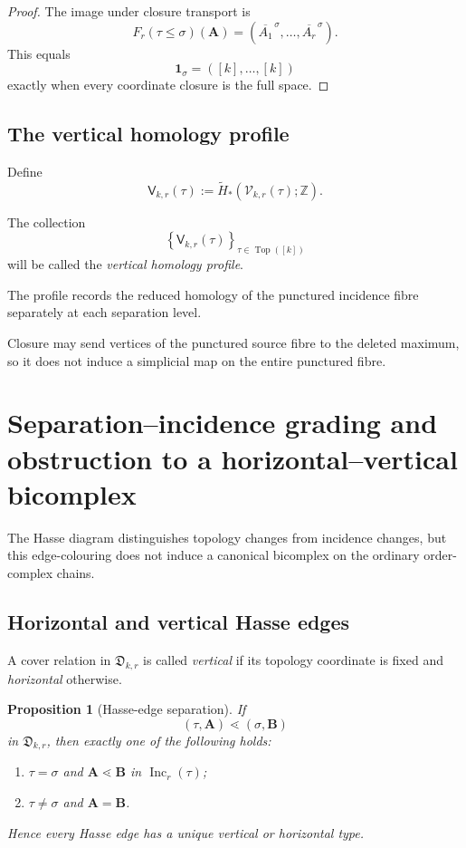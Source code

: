 \documentclass[11pt]{article}
\theoremstyle{plain}
\newtheorem{proposition}[theorem]{Proposition}
\theoremstyle{definition}
\begin{document}
\begin{proof}
The image under closure transport is
\[
F_r(\tau\leq\sigma)(\mathbf A)
=
\left(
\overline{A_1}^{\,\sigma},
\ldots,
\overline{A_r}^{\,\sigma}
\right).
\]
This equals
\[
\mathbf1_\sigma
=
([k],\ldots,[k])
\]
exactly when every coordinate closure is the full space.
\end{proof}



\subsection{The vertical homology profile}
\label{subsec:vertical-homology-profile}

Define
\[
\mathsf V_{k,r}(\tau)
:=
\widetilde H_*
\left(
\mathcal V_{k,r}(\tau);
\mathbb Z
\right).
\]

The collection
\[
\left\{
\mathsf V_{k,r}(\tau)
\right\}_{\tau\in\operatorname{Top}([k])}
\]
will be called the \emph{vertical homology profile}.

The profile records the reduced homology of the punctured incidence fibre
separately at each separation level.

Closure may send vertices of the punctured source fibre to the deleted maximum, so it does not induce a simplicial map on the entire punctured fibre.




\section{Separation--incidence grading and obstruction to a horizontal--vertical bicomplex}
\label{sec:separation-incidence-grading}

The Hasse diagram distinguishes topology changes from incidence changes, but this edge-colouring does not induce a canonical bicomplex on the ordinary order-complex chains.

\subsection{Horizontal and vertical Hasse edges}
\label{subsec:horizontal-vertical-Hasse}

A cover relation in $\mathfrak D_{k,r}$ is called \emph{vertical} if its topology
coordinate is fixed and \emph{horizontal} otherwise.

\begin{proposition}[Hasse-edge separation]
\label{prop:Hasse-bicoloring}
If
\[
(\tau,\mathbf A)\lessdot(\sigma,\mathbf B)
\]
in $\mathfrak D_{k,r}$, then exactly one of the following holds:
\begin{enumerate}[label=(\roman*)]
\item $\tau=\sigma$ and $\mathbf A\lessdot\mathbf B$ in
$\operatorname{Inc}_r(\tau)$;
\item $\tau\neq\sigma$ and $\mathbf A=\mathbf B$.
\end{enumerate}
Hence every Hasse edge has a unique vertical or horizontal type.
\end{proposition}
\end{document}
